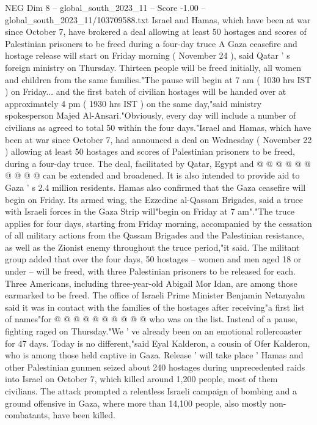 \begin{textsample}{NEG Dim 8 – global\_south\_2023\_11 – Score -1.00 – global\_south\_2023\_11/103709588.txt}  \label{ex:f8_neg_190}
Israel and Hamas, which have been at war since October 7, have brokered a deal allowing at least 50 hostages and scores of Palestinian prisoners to be freed during a four-day truce A Gaza ceasefire and hostage release will start on Friday morning ( November 24 ), said Qatar ' s foreign ministry on Thursday.
Thirteen people will be freed initially, all women and children from the same families."The pause will begin at 7 am ( 1030 hrs IST ) on Friday... and the first batch of civilian hostages will be handed over at approximately 4 pm ( 1930 hrs IST ) on the same day,"said ministry spokesperson Majed Al-Ansari."Obviously, every day will include a number of civilians as agreed to total 50 within the four days."Israel and Hamas, which have been at war since October 7, had announced a deal on Wednesday ( November 22 ) allowing at least 50 hostages and scores of Palestinian prisoners to be freed, during a four-day truce.
The deal, facilitated by Qatar, Egypt and @ @ @ @ @ @ @ @ @ @ can be extended and broadened.
It is also intended to provide aid to Gaza ' s 2.4 million residents.
Hamas also confirmed that the Gaza ceasefire will begin on Friday.
Its armed wing, the Ezzedine al-Qassam Brigades, said a truce with Israeli forces in the Gaza Strip will"begin on Friday at 7 am"."The truce applies for four days, starting from Friday morning, accompanied by the cessation of all military actions from the Qassam Brigades and the Palestinian resistance, as well as the Zionist enemy throughout the truce period,"it said.
The militant group added that over the four days, 50 hostages -- women and men aged 18 or under -- will be freed, with three Palestinian prisoners to be released for each.
Three Americans, including three-year-old Abigail Mor Idan, are among those earmarked to be freed.
The office of Israeli Prime Minister Benjamin Netanyahu said it was in contact with the families of the hostages after receiving"a first list of names"for @ @ @ @ @ @ @ @ @ @ who was on the list.
Instead of a pause, fighting raged on Thursday."We ' ve already been on an emotional rollercoaster for 47 days.
Today is no different,"said Eyal Kalderon, a cousin of Ofer Kalderon, who is among those held captive in Gaza.
Release ' will take place ' Hamas and other Palestinian gunmen seized about 240 hostages during unprecedented raids into Israel on October 7, which killed around 1,200 people, most of them civilians.
The attack prompted a relentless Israeli campaign of bombing and a ground offensive in Gaza, where more than 14,100 people, also mostly non-combatants, have been killed.

\end{textsample}
